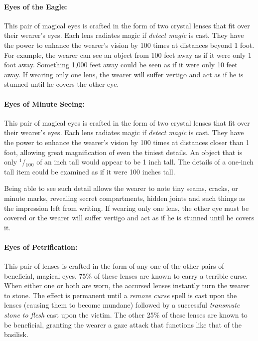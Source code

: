 \begin{multicols}{2}
\paragraph{Eyes of the Eagle:} This pair of magical eyes is crafted in the form of two crystal lenses that fit over their wearer's eyes.  Each lens radiates magic if \textit{detect magic} is cast.  They have the power to enhance the wearer's vision by 100 times at distances beyond 1 foot.  For example, the wearer can see an object from 100 feet away as if it were only 1 foot away.  Something 1,000 feet away could be seen as if it were only 10 feet away.  If wearing only one lens, the wearer will suffer vertigo and act as if he is stunned until he covers the other eye.

\paragraph{Eyes of Minute Seeing:} This pair of magical eyes is crafted in the form of two crystal lenses that fit over their wearer's eyes.  Each lens radiates magic if \textit{detect magic} is cast.  They have the power to enhance the wearer's vision by 100 times at distances closer than 1 foot, allowing great magnification of even the tiniest details.  An object that is only $^1$/$_1$$_0$$_0$ of an inch tall would appear to be 1 inch tall.  The details of a one-inch tall item could be examined as if it were 100 inches tall.  

Being able to see such detail allows the wearer to note tiny seams, cracks, or minute marks, revealing secret compartments, hidden joints and such things as the impression left from writing.  If wearing only one lens, the other eye must be covered or the wearer will suffer vertigo and act as if he is stunned until he covers it.

\paragraph{Eyes of Petrification:} This pair of lenses is crafted in the form of any one of the other pairs of beneficial, magical eyes.  75\% of these lenses are known to carry a terrible curse.  When either one or both are worn, the accursed lenses instantly turn the wearer to stone.  The effect is permanent until a \textit{remove curse} spell is cast upon the lenses (causing them to become mundane) followed by a successful \textit{transmute stone to flesh} cast upon the victim.  The other 25\% of these lenses are known to be beneficial, granting the wearer a gaze attack that functions like that of the basilisk.


\end{multicols}

